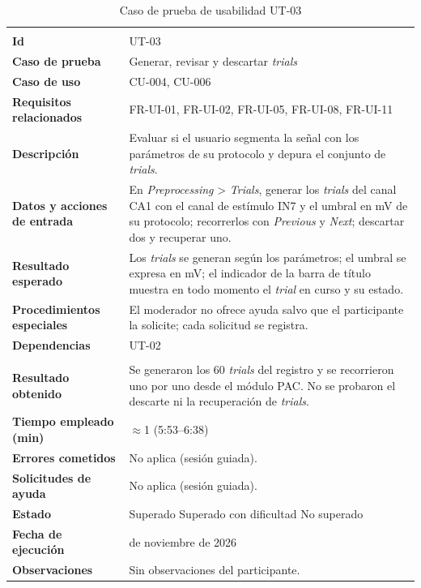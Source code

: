 \documentclass[12pt,letterpaper,oneside]{article}
\DeclareRobustCommand{\_}{\textunderscore\allowbreak}
\newcommand{\fechasesion}{11 de noviembre de 2026}
\newcommand{\casilla}[1]{%
    \fbox{\makebox[1em][c]{#1}}%
}
\begin{document}
\begin{center}
\small
\begin{longtable}{|>{\raggedright\arraybackslash}p{}|>{\raggedright\arraybackslash}p{}|}
\hline
\endfirsthead
\hline
\endhead
\hline
\endfoot
\hline
\caption{Caso de prueba de usabilidad UT-03} \label{tab:ut-03} \\
\endlastfoot
\textbf{Id} & UT-03 \\
\hline
\textbf{Caso de prueba} & Generar, revisar y descartar \textit{trials} \\
\hline
\textbf{Caso de uso} & CU-004, CU-006 \\
\hline
\textbf{Requisitos relacionados} & FR-UI-01, FR-UI-02, FR-UI-05, FR-UI-08, FR-UI-11 \\
\hline
\textbf{Descripción} & Evaluar si el usuario segmenta la señal con los parámetros de su protocolo y depura el conjunto de \textit{trials}. \\
\hline
\textbf{Datos y acciones de entrada} & En \textit{Preprocessing} > \textit{Trials}, generar los \textit{trials} del canal CA1 con el canal de estímulo IN7 y el umbral en mV de su protocolo; recorrerlos con \textit{Previous} y \textit{Next}; descartar dos y recuperar uno. \\
\hline
\textbf{Resultado esperado} & Los \textit{trials} se generan según los parámetros; el umbral se expresa en mV; el indicador de la barra de título muestra en todo momento el \textit{trial} en curso y su estado. \\
\hline
\textbf{Procedimientos especiales} & El moderador no ofrece ayuda salvo que el participante la solicite; cada solicitud se registra. \\
\hline
\textbf{Dependencias} & UT-02 \\
\hline
\multicolumn{2}{|c|}{\textbf{Información para el seguimiento}} \\
\hline
\textbf{Resultado obtenido} & Se generaron los 60 \textit{trials} del registro y se recorrieron uno por uno desde el módulo PAC. No se probaron el descarte ni la recuperación de \textit{trials}. \\
\hline
\textbf{Tiempo empleado (min)} & $\approx$1 (5:53--6:38) \\
\hline
\textbf{Errores cometidos} & No aplica (sesión guiada). \\
\hline
\textbf{Solicitudes de ayuda} & No aplica (sesión guiada). \\
\hline
\textbf{Estado} & \casilla{x} Superado \qquad \casilla{} Superado con dificultad \qquad \casilla{} No superado \\
\hline
\textbf{Fecha de ejecución} & \fechasesion \\
\hline
\textbf{Observaciones} & Sin observaciones del participante. \\
\hline
\end{longtable}
\end{center}
\end{document}
